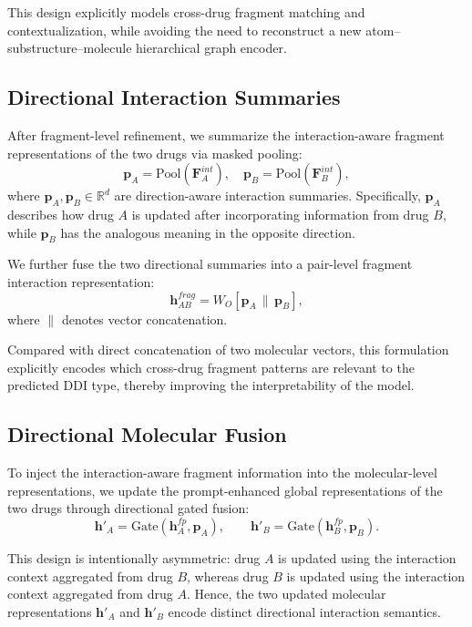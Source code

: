 This design explicitly models cross-drug fragment matching and contextualization, while avoiding the need to reconstruct a new atom--substructure--molecule hierarchical graph encoder.

\subsection{Directional Interaction Summaries}

After fragment-level refinement, we summarize the interaction-aware fragment representations of the two drugs via masked pooling:
\begin{equation}
\mathbf{p}_A = \mathrm{Pool}(\mathbf{F}^{int}_A), \quad
\mathbf{p}_B = \mathrm{Pool}(\mathbf{F}^{int}_B),
\end{equation}
where $\mathbf{p}_A, \mathbf{p}_B \in \mathbb{R}^{d}$ are direction-aware interaction summaries. Specifically, $\mathbf{p}_A$ describes how drug $A$ is updated after incorporating information from drug $B$, while $\mathbf{p}_B$ has the analogous meaning in the opposite direction.

We further fuse the two directional summaries into a pair-level fragment interaction representation:
\begin{equation}
\mathbf{h}^{frag}_{AB} = W_O [\mathbf{p}_A \,\|\, \mathbf{p}_B],
\end{equation}
where $\|$ denotes vector concatenation.

Compared with direct concatenation of two molecular vectors, this formulation explicitly encodes which cross-drug fragment patterns are relevant to the predicted DDI type, thereby improving the interpretability of the model.

\subsection{Directional Molecular Fusion}

To inject the interaction-aware fragment information into the molecular-level representations, we update the prompt-enhanced global representations of the two drugs through directional gated fusion:
\begin{equation}
\mathbf{h}'_A = \mathrm{Gate}(\mathbf{h}^{fp}_A, \mathbf{p}_A), \qquad
\mathbf{h}'_B = \mathrm{Gate}(\mathbf{h}^{fp}_B, \mathbf{p}_B).
\end{equation}

This design is intentionally asymmetric: drug $A$ is updated using the interaction context aggregated from drug $B$, whereas drug $B$ is updated using the interaction context aggregated from drug $A$. Hence, the two updated molecular representations $\mathbf{h}'_A$ and $\mathbf{h}'_B$ encode distinct directional interaction semantics.

